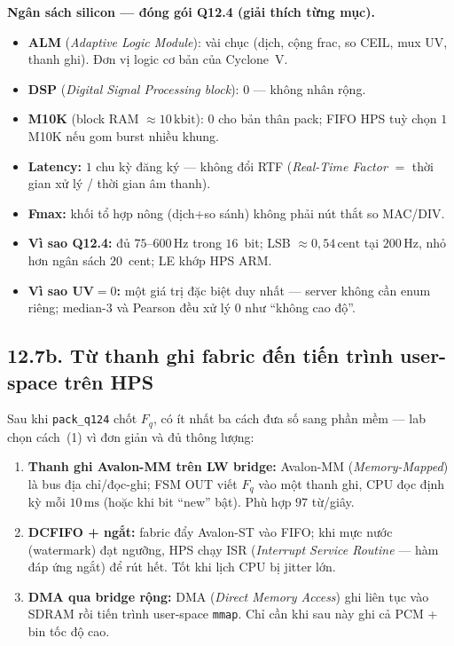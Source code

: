 \begin{costbox}
\textbf{Ngân sách silicon --- đóng gói Q12.4 (giải thích từng mục).}
\begin{itemize}[leftmargin=1.2em]
    \item \textbf{ALM} (\emph{Adaptive Logic Module}): vài chục (dịch, cộng frac, so CEIL, mux UV, thanh ghi). Đơn vị logic cơ bản của Cyclone~V.
    \item \textbf{DSP} (\emph{Digital Signal Processing block}): $0$ --- không nhân rộng.
    \item \textbf{M10K} (block RAM $\approx 10\,\text{kbit}$): $0$ cho bản thân pack; FIFO HPS tuỳ chọn $1$ M10K nếu gom burst nhiều khung.
    \item \textbf{Latency:} $1$ chu kỳ đăng ký --- không đổi RTF (\emph{Real-Time Factor} $=$ thời gian xử lý / thời gian âm thanh).
    \item \textbf{Fmax:} khối tổ hợp nông (dịch+so sánh) không phải nút thắt so MAC/DIV.
    \item \textbf{Vì sao Q12.4:} đủ $75$--$600\,\text{Hz}$ trong $16$~bit; LSB $\approx 0{,}54\,\text{cent}$ tại $200\,\text{Hz}$, nhỏ hơn ngân sách $20$~cent; LE khớp HPS ARM.
    \item \textbf{Vì sao UV$=0$:} một giá trị đặc biệt duy nhất --- server không cần enum riêng; median-3 và Pearson đều xử lý $0$ như ``không cao độ''.
\end{itemize}
\end{costbox}


\subsection*{12.7b. Từ thanh ghi fabric đến tiến trình user-space trên HPS}

Sau khi \texttt{pack\_q124} chốt $F_q$, có ít nhất ba cách đưa số sang phần mềm --- lab chọn cách~(1) vì đơn giản và đủ thông lượng:

\begin{enumerate}[leftmargin=1.4em]
  \item \textbf{Thanh ghi Avalon-MM trên LW bridge:} Avalon-MM (\emph{Memory-Mapped}) là bus địa chỉ/đọc-ghi; FSM OUT viết $F_q$ vào một thanh ghi, CPU đọc định kỳ mỗi $10\,\text{ms}$ (hoặc khi bit ``new'' bật). Phù hợp $97$ từ/giây.
  \item \textbf{DCFIFO + ngắt:} fabric đẩy Avalon-ST vào FIFO; khi mực nước (watermark) đạt ngưỡng, HPS chạy ISR (\emph{Interrupt Service Routine} --- hàm đáp ứng ngắt) để rút hết. Tốt khi lịch CPU bị jitter lớn.
  \item \textbf{DMA qua bridge rộng:} DMA (\emph{Direct Memory Access}) ghi liên tục vào SDRAM rồi tiến trình user-space \texttt{mmap}. Chỉ cần khi sau này ghi cả PCM + bin tốc độ cao.
\end{enumerate}

